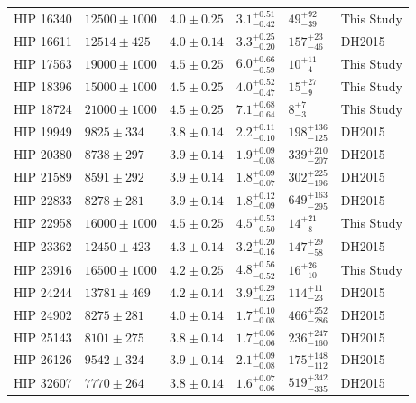 \documentclass{emulateapj}
\begin{document}
\begin{longtable*}{|l|lllll|}
  HIP 16340 &  $12500 \pm 1000$ &  $4.0 \pm 0.25$ &  $3.1^{+0.51}_{-0.42}$ &     $49^{+92}_{-39}$ &  This Study \\
  HIP 16611 &   $12514 \pm 425$ &  $4.0 \pm 0.14$ &  $3.3^{+0.25}_{-0.20}$ &    $157^{+23}_{-46}$ &      DH2015 \\
  HIP 17563 &  $19000 \pm 1000$ &  $4.5 \pm 0.25$ &  $6.0^{+0.66}_{-0.59}$ &      $10^{+11}_{-4}$ &  This Study \\
  HIP 18396 &  $15000 \pm 1000$ &  $4.5 \pm 0.25$ &  $4.0^{+0.52}_{-0.47}$ &      $15^{+27}_{-9}$ &  This Study \\
  HIP 18724 &  $21000 \pm 1000$ &  $4.5 \pm 0.25$ &  $7.1^{+0.68}_{-0.64}$ &        $8^{+7}_{-3}$ &  This Study \\
  HIP 19949 &    $9825 \pm 334$ &  $3.8 \pm 0.14$ &  $2.2^{+0.11}_{-0.10}$ &  $198^{+136}_{-125}$ &      DH2015 \\
  HIP 20380 &    $8738 \pm 297$ &  $3.9 \pm 0.14$ &  $1.9^{+0.09}_{-0.08}$ &  $339^{+210}_{-207}$ &      DH2015 \\
  HIP 21589 &    $8591 \pm 292$ &  $3.9 \pm 0.14$ &  $1.8^{+0.09}_{-0.07}$ &  $302^{+225}_{-196}$ &      DH2015 \\
  HIP 22833 &    $8278 \pm 281$ &  $3.9 \pm 0.14$ &  $1.8^{+0.12}_{-0.09}$ &  $649^{+163}_{-295}$ &      DH2015 \\
  HIP 22958 &  $16000 \pm 1000$ &  $4.5 \pm 0.25$ &  $4.5^{+0.53}_{-0.50}$ &      $14^{+21}_{-8}$ &  This Study \\
  HIP 23362 &   $12450 \pm 423$ &  $4.3 \pm 0.14$ &  $3.2^{+0.20}_{-0.16}$ &    $147^{+29}_{-58}$ &      DH2015 \\
  HIP 23916 &  $16500 \pm 1000$ &  $4.2 \pm 0.25$ &  $4.8^{+0.56}_{-0.52}$ &     $16^{+26}_{-10}$ &  This Study \\
  HIP 24244 &   $13781 \pm 469$ &  $4.2 \pm 0.14$ &  $3.9^{+0.29}_{-0.23}$ &    $114^{+11}_{-23}$ &      DH2015 \\
  HIP 24902 &    $8275 \pm 281$ &  $4.0 \pm 0.14$ &  $1.7^{+0.10}_{-0.08}$ &  $466^{+252}_{-286}$ &      DH2015 \\
  HIP 25143 &    $8101 \pm 275$ &  $3.8 \pm 0.14$ &  $1.7^{+0.06}_{-0.06}$ &  $236^{+247}_{-160}$ &      DH2015 \\
  HIP 26126 &    $9542 \pm 324$ &  $3.9 \pm 0.14$ &  $2.1^{+0.09}_{-0.08}$ &  $175^{+148}_{-112}$ &      DH2015 \\
  HIP 32607 &    $7770 \pm 264$ &  $3.8 \pm 0.14$ &  $1.6^{+0.07}_{-0.06}$ &  $519^{+342}_{-335}$ &      DH2015 \\

\end{longtable*}
\end{document}
